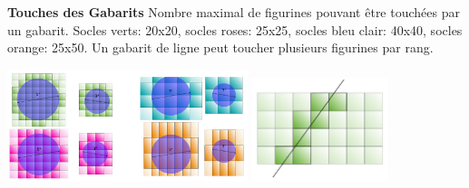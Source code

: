 {\medskip
{\normalsize \noindent \textbf{Touches des Gabarits}}
\newline \noindent Nombre maximal de figurines pouvant être touchées par un gabarit. Socles verts: 20x20\milli\meter{}, socles roses: 25x25\milli\meter{}, socles bleu clair: 40x40\milli\meter{}, socles orange: 25x50\milli\meter{}. Un gabarit de ligne peut toucher plusieurs figurines par rang.
\begin{center}
\includegraphics[width=7cm]{gabarits_1.png}
\includegraphics[width=4cm]{gabarits_2.png}
\end{center}

}

